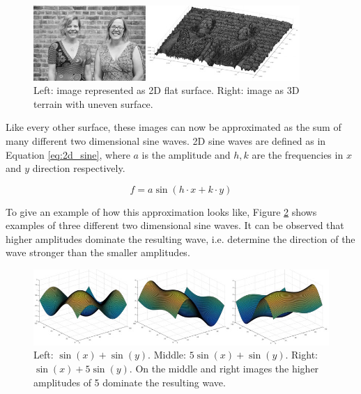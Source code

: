 \begin{figure}[!htb]
	\centering
	\includegraphics[width = 0.9\textwidth]{images/image_surfaces.jpg}
	\caption{Left: image represented as 2D flat surface. Right: image as 3D terrain with uneven surface. \protect\footnotemark}
	\label{fig:image_surfaces}
\end{figure}



Like every other surface, these images can now be approximated as the sum of many different two dimensional sine waves. 2D sine waves are defined as in Equation \ref{eq:2d_sine}, where $a$ is the amplitude and $h, k$ are the frequencies in $x$ and $y$ direction respectively.

\begin{equation}
	f = a \sin(h\cdot x+k\cdot y)
	\label{eq:2d_sine}
\end{equation}

To give an example of how this approximation looks like, Figure \ref{fig:2d_sine} shows examples of three different two dimensional sine waves. It can be observed that higher amplitudes dominate the resulting wave, i.e. determine the direction of the wave stronger than the smaller amplitudes. 


\begin{figure}[!htb]
	\centering
	\includegraphics[width = \textwidth]{images/2d_sine.jpg}
	\caption{Left: $\sin(x) +\sin(y)$. Middle:  $5 \sin(x)+ \sin(y)$. Right: $	\sin(x)+5\sin(y)$. On the middle and right images the higher amplitudes of 5 dominate the resulting wave. \protect\footnotemark}
	\label{fig:2d_sine}
\end{figure}

